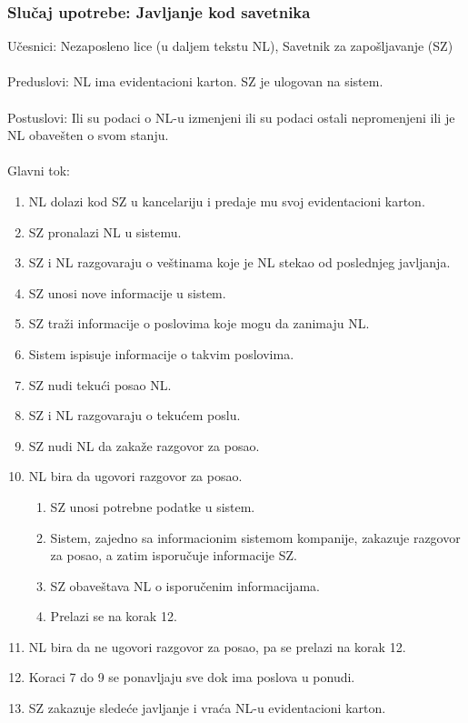 \subsubsection{Slu\v caj upotrebe: Javljanje kod savetnika}
\label{su: javljanje kod savetnika}

\noindent U\v cesnici: Nezaposleno lice (u daljem tekstu NL), Savetnik za zapo\v sljavanje (SZ)
\\
\\ Preduslovi: NL ima evidentacioni karton. SZ je ulogovan na sistem. 
\\
\\ Postuslovi: Ili su podaci o NL-u izmenjeni ili su podaci ostali nepromenjeni ili je NL obave\v sten o svom stanju.
\\ 
\\ Glavni tok:
\begin{enumerate}
	\item NL dolazi kod SZ u kancelariju i predaje mu svoj evidentacioni karton.
	\item SZ pronalazi NL u sistemu.
	\item SZ i NL razgovaraju o ve\v stinama koje je NL stekao od poslednjeg javljanja.
	\item SZ unosi nove informacije u sistem.
	\item SZ tra\v zi informacije o poslovima koje mogu da zanimaju NL.
	\item Sistem ispisuje informacije o takvim poslovima. 
	\item SZ nudi teku\' ci posao NL.
	\item SZ i NL razgovaraju o teku\' cem poslu.
	\item SZ nudi NL da zaka\v ze razgovor za posao.
	\item NL bira da ugovori razgovor za posao.
	\begin{enumerate}
		\item SZ unosi potrebne podatke u sistem.
		\item Sistem, zajedno sa informacionim sistemom kompanije, zakazuje razgovor za posao, a zatim isporu\v cuje informacije SZ.
		\item SZ obave\v stava NL o isporu\v cenim informacijama.
		\item Prelazi se na korak 12.
	\end{enumerate}
	\item NL bira da ne ugovori razgovor za posao, pa se prelazi na korak 12.
	\item Koraci 7 do 9 se ponavljaju sve dok ima poslova u ponudi.
	\item SZ zakazuje slede\' ce javljanje i vra\' ca NL-u evidentacioni karton.
\end{enumerate}

